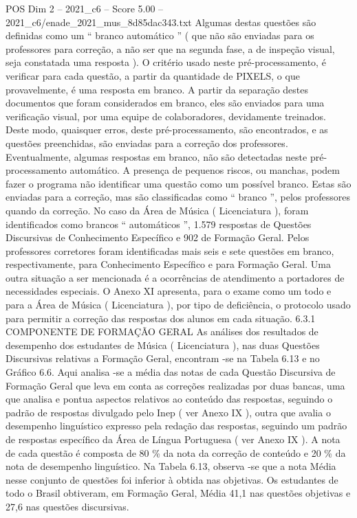 \begin{textsample}{POS Dim 2 – 2021\_c6 – Score 5.00 – 2021\_c6/enade\_2021\_mus\_8d85dac343.txt}
Algumas destas questões são definidas como um “ branco automático ” ( que não são enviadas para os professores para correção, a não ser que na segunda fase, a de inspeção visual, seja constatada uma resposta ).
O critério usado neste pré-processamento, é verificar para cada questão, a partir da quantidade de PIXELS, o que provavelmente, é uma resposta em branco.
A partir da separação destes documentos que foram considerados em branco, eles são enviados para uma verificação visual, por uma equipe de colaboradores, devidamente treinados.
Deste modo, quaisquer erros, deste pré-processamento, são encontrados, e as questões preenchidas, são enviadas para a correção dos professores.
Eventualmente, algumas respostas em branco, não são detectadas neste pré-processamento automático.
A presença de pequenos riscos, ou manchas, podem fazer o programa não identificar uma questão como um possível branco.
Estas são enviadas para a correção, mas são classificadas como “ branco ”, pelos professores quando da correção.
No caso da Área de Música ( Licenciatura ), foram identificados como brancos “ automáticos ”, 1.579 respostas de Questões Discursivas de Conhecimento Específico e 902 de Formação Geral.
Pelos professores corretores foram identificadas mais seis e sete questões em branco, respectivamente, para Conhecimento Específico e para Formação Geral.
Uma outra situação a ser mencionada é a ocorrências de atendimento a portadores de necessidades especiais.
O Anexo XI apresenta, para o exame como um todo e para a Área de Música ( Licenciatura ), por tipo de deficiência, o protocolo usado para permitir a correção das respostas dos alunos em cada situação. 6.3.1 COMPONENTE DE FORMAÇÃO GERAL As análises dos resultados de desempenho dos estudantes de Música ( Licenciatura ), nas duas Questões Discursivas relativas a Formação Geral, encontram -se na Tabela 6.13 e no Gráfico 6.6.
Aqui analisa -se a média das notas de cada Questão Discursiva de Formação Geral que leva em conta as correções realizadas por duas bancas, uma que analisa e pontua aspectos relativos ao conteúdo das respostas, seguindo o padrão de respostas divulgado pelo Inep ( ver Anexo IX ), outra que avalia o desempenho linguístico expresso pela redação das respostas, seguindo um padrão de respostas específico da Área de Língua Portuguesa ( ver Anexo IX ).
A nota de cada questão é composta de 80 \% da nota da correção de conteúdo e 20 \% da nota de desempenho linguístico.
Na Tabela 6.13, observa -se que a nota Média nesse conjunto de questões foi inferior à obtida nas objetivas.
Os estudantes de todo o Brasil obtiveram, em Formação Geral, Média 41,1 nas questões objetivas e 27,6 nas questões discursivas.

\end{textsample}
